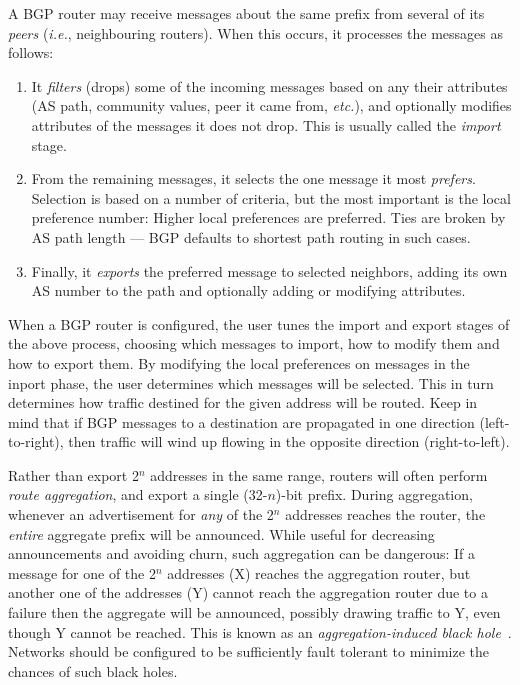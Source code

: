 \documentclass{sig-alternate-10pt}
\newcommand{\IE}{\emph{i.e.}}
\newcommand{\ETC}{\emph{etc.}}
\begin{document}
A BGP router may receive messages about the same prefix from several
of its \emph{peers} (\IE, neighbouring routers).  When this occurs,
it processes the messages as follows:
\begin{enumerate}
\item It \emph{filters} (drops) some of the incoming messages based on
any their attributes (AS path, community values, peer it came from, \ETC),
and optionally modifies attributes of the messages it does not drop.
This is usually called the \emph{import} stage.
\item From the remaining messages, it selects the one message it
most \emph{prefers}. Selection is based on a number of criteria, but the
most important is the local preference number: Higher local preferences
are preferred.  Ties are broken by AS path length --- BGP defaults to 
shortest path routing in such cases.
\item Finally, it \emph{exports} the preferred message to selected neighbors,
adding its own AS number to the path and optionally adding or
modifying attributes.
\end{enumerate}
When a BGP router is configured, the user tunes the import and export
stages of the above process, choosing which messages to import, how to
modify them and how to export them.  By modifying the local preferences
on messages in the inport phase, the user determines which messages will
be selected.  This in turn determines how traffic destined for the given
address will be routed.  Keep in mind that if BGP messages to a destination
are propagated in one direction (left-to-right), then traffic will wind
up flowing in the opposite direction (right-to-left).

Rather than export 2$^n$ addresses in the same range, routers will
often perform \emph{route aggregation}, and export a single (32-$n$)-bit
prefix.  During aggregation, whenever an advertisement for 
\emph{any} of the 2$^n$ addresses
reaches the router, the \emph{entire} aggregate prefix will be announced.
While useful for decreasing announcements and avoiding churn, such
aggregation can be dangerous:  If a message for one of the 2$^n$ addresses (X)
reaches the aggregation router, but another one of the addresses (Y)
cannot reach the aggregation router due to a failure then the aggregate
will be announced, possibly drawing traffic to Y, even though Y cannot be
reached.  This is known as an \emph{aggregation-induced black hole}~\cite{route-aggregation}.
Networks should be configured to be sufficiently fault tolerant to minimize
the chances of such black holes.
\end{document}
